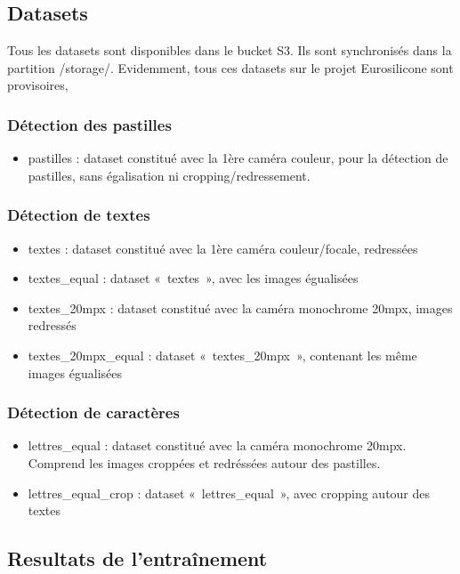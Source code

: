 \subsection{Datasets}
Tous les datasets sont disponibles dans le bucket S3.
Ils sont synchronisés dans la partition /storage/.
Evidemment, tous ces datasets sur le projet Eurosilicone sont provisoires,

\subsubsection{Détection des pastilles}
\begin{itemize}
    \item pastilles : dataset constitué avec la 1ère caméra couleur, pour la détection de pastilles, sans égalisation ni cropping/redressement.
\end{itemize}

\subsubsection{Détection de textes}
\begin{itemize}
    \item textes : dataset constitué avec la 1ère caméra couleur/focale, redressées
    \item textes_equal : dataset « textes », avec les images égualisées
    \item textes_20mpx : dataset constitué avec la caméra monochrome 20mpx, images redressés
    \item textes_20mpx_equal : dataset « textes_20mpx », contenant les même images égualisées
\end{itemize}

\subsubsection{Détection de caractères}
\begin{itemize}
    \item lettres_equal : dataset constitué avec la caméra monochrome 20mpx. Comprend les images croppées et redréssées autour des pastilles.
    \item lettres_equal_crop : dataset « lettres_equal », avec cropping autour des textes
\end{itemize}

\subsection{Resultats de l'entraînement}

